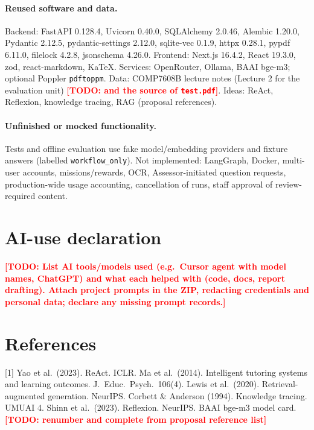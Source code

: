 \documentclass{article}
\newcommand{\todo}[1]{\textcolor{red}{\textbf{[TODO: #1]}}}
\newcommand{\code}[1]{\texttt{\small #1}}
\begin{document}
\paragraph{Reused software and data.} Backend: FastAPI 0.128.4, Uvicorn 0.40.0, SQLAlchemy 2.0.46, Alembic 1.20.0, Pydantic 2.12.5, pydantic-settings 2.12.0, sqlite-vec 0.1.9, httpx 0.28.1, pypdf 6.11.0, filelock 4.2.8, jsonschema 4.26.0. Frontend: Next.js 16.4.2, React 19.3.0, zod, react-markdown, KaTeX. Services: OpenRouter, Ollama, BAAI bge-m3; optional Poppler \code{pdftoppm}. Data: COMP7608B lecture notes (Lecture 2 for the evaluation unit) \todo{and the source of \code{test.pdf}}. Ideas: ReAct, Reflexion, knowledge tracing, RAG (proposal references).

\paragraph{Unfinished or mocked functionality.} Tests and offline evaluation use fake model/embedding providers and fixture answers (labelled \code{workflow\_only}). Not implemented: LangGraph, Docker, multi-user accounts, missions/rewards, OCR, Assessor-initiated question requests, production-wide usage accounting, cancellation of runs, staff approval of review-required content.

\section*{AI-use declaration}
\todo{List AI tools/models used (e.g.\ Cursor agent with model names, ChatGPT) and what each helped with (code, docs, report drafting). Attach project prompts in the ZIP, redacting credentials and personal data; declare any missing prompt records.}

\section*{References}
\small
[1] Yao et al.\ (2023). ReAct. ICLR. \quad
[2] Ma et al.\ (2014). Intelligent tutoring systems and learning outcomes. J.\ Educ.\ Psych.\ 106(4). \quad
[4] Lewis et al.\ (2020). Retrieval-augmented generation. NeurIPS. \quad
[5] Corbett \& Anderson (1994). Knowledge tracing. UMUAI 4. \quad
[6] Shinn et al.\ (2023). Reflexion. NeurIPS. \quad
[10] BAAI bge-m3 model card. \todo{renumber and complete from proposal reference list}
\end{document}
